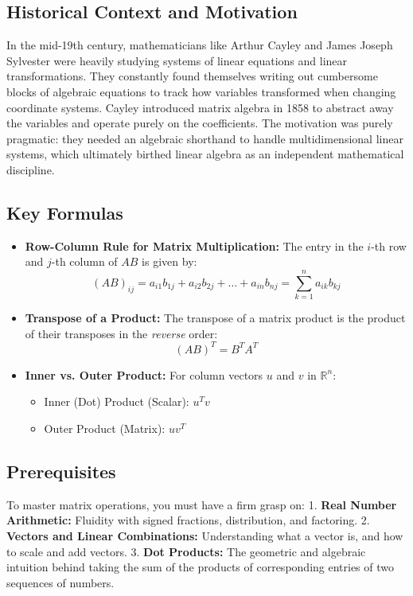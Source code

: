 \documentclass{article}
\begin{document}
\subsection*{Historical Context and Motivation}
In the mid-19th century, mathematicians like Arthur Cayley and James Joseph Sylvester were heavily studying systems of linear equations and linear transformations. They constantly found themselves writing out cumbersome blocks of algebraic equations to track how variables transformed when changing coordinate systems. Cayley introduced matrix algebra in 1858 to abstract away the variables and operate purely on the coefficients. The motivation was purely pragmatic: they needed an algebraic shorthand to handle multidimensional linear systems, which ultimately birthed linear algebra as an independent mathematical discipline.

\subsection*{Key Formulas}
\begin{itemize}
    \item \textbf{Row-Column Rule for Matrix Multiplication:} The entry in the $i$-th row and $j$-th column of $AB$ is given by:
    \[ (AB)_{ij} = a_{i1}b_{1j} + a_{i2}b_{2j} + \dots + a_{in}b_{nj} = \sum_{k=1}^{n} a_{ik}b_{kj} \]
    \item \textbf{Transpose of a Product:} The transpose of a matrix product is the product of their transposes in the \textit{reverse} order:
    \[ (AB)^T = B^T A^T \]
    \item \textbf{Inner vs. Outer Product:} For column vectors $u$ and $v$ in $\mathbb{R}^n$:
    \begin{itemize}
        \item Inner (Dot) Product (Scalar): $u^T v$
        \item Outer Product (Matrix): $uv^T$
    \end{itemize}
\end{itemize}

\subsection*{Prerequisites}
To master matrix operations, you must have a firm grasp on:
1. \textbf{Real Number Arithmetic:} Fluidity with signed fractions, distribution, and factoring.
2. \textbf{Vectors and Linear Combinations:} Understanding what a vector is, and how to scale and add vectors.
3. \textbf{Dot Products:} The geometric and algebraic intuition behind taking the sum of the products of corresponding entries of two sequences of numbers.
\end{document}
